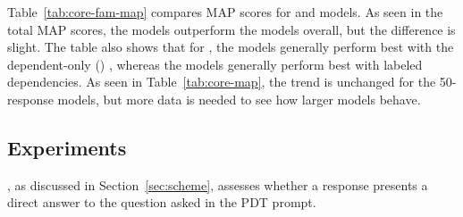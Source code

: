 Table~\ref{tab:core-fam-map} compares  MAP scores for  and  models. As seen in the total MAP scores, the  models outperform the  models overall, but the difference is slight. The table also shows that for , the  models generally perform best with the dependent-only () , whereas the  models generally perform best with labeled dependencies. As seen in Table~\ref{tab:core-map}, the trend is unchanged for the  50-response models, but more data is needed to see how larger  models behave.



\subsection{ Experiments}
\label{sec:map-answer}

, as discussed in Section~\ref{sec:scheme}, assesses whether a response presents a direct answer to the question asked in the PDT prompt.

